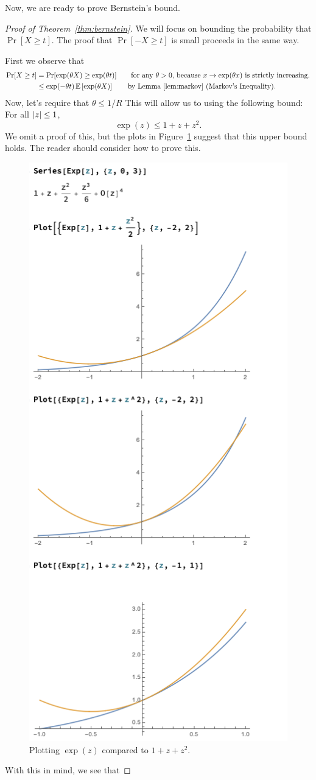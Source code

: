 Now, we are ready to prove Bernstein's bound.
\begin{proof}[Proof of Theorem~\ref{thm:bernstein}]
  We will focus on bounding the probability that $\Pr[ X \geq t] $.
  The proof that $\Pr[ -X \geq t] $ is small proceeds in the same way.

  First we observe that
  \begin{align*}
    \Pr[ X \geq t ]
    &=
      \Pr [ \exp(\theta X) \geq \exp(\theta t) ]
      \tag*{for any $\theta >0$,
      because $x \to \exp(\theta x)$ is strictly increasing.}
    \\
    &\leq \exp(-\theta t) \E{\exp(\theta X)}
      \tag*{by Lemma~\ref{lem:markov} (Markov's Inequality).}
  \end{align*}
  Now, let's require that $\theta \leq 1/R$
  This will allow us to using the following bound: For all $\left|z \right|
  \leq 1$,
  \begin{equation}
     \label{eq:expub}
  \exp(z) \leq 1+z+z^2.
\end{equation}
We omit a proof of this, but the plots in Figure~\ref{fig:expub}
suggest that this upper bound holds. The reader should consider how to
prove this.
\begin{figure}[h]
  \centering
  \includegraphics[width=0.4
  \textwidth]{fig/lecture7_exp-bounds}
\caption{Plotting $\exp(z)$ compared to $1+z+z^2$.}
\label{fig:expub}
\end{figure}
With this in mind, we see that

\end{proof}
